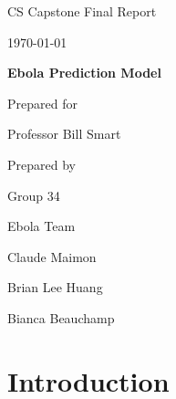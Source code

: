 \documentclass[onecolumn, draftclsnofoot,10pt, compsoc]{IEEEtran}
\def \CapstoneTeamName{		Ebola Team}
\def \CapstoneTeamNumber{		34}
\def \GroupMemberOne{			Claude Maimon}
\def \GroupMemberTwo{			Brian Lee Huang}
\def \GroupMemberThree{			Bianca Beauchamp}
\def \CapstoneProjectName{		Ebola Prediction Model}
\def \CapstoneSponsorCompany{	Professor Bill Smart}
\def \DocType{		Final Report
}
\newcommand{\NameSigPair}[1]{\par
	\makebox[2.75in][r]{#1} \hfil 	\makebox[3.25in]{\makebox[2.25in]{\hrulefill} \hfill		\makebox[.75in]{\hrulefill}}
	\par\vspace{-12pt} \textit{\tiny\noindent
		\makebox[2.75in]{} \hfil		\makebox[3.25in]{\makebox[2.25in][r]{Signature} \hfill	\makebox[.75in][r]{Date}}}}
\renewcommand{\NameSigPair}[1]{#1}
\begin{document}
	\begin{titlepage}
		\begin{singlespace}
			\hfill 
			\par\vspace{.2in}
			\centering
			\scshape{
				\huge CS Capstone \DocType \par
				{\large\today}\par
				\vspace{.5in}
				\textbf{\Huge\CapstoneProjectName}\par
				\vfill
				{\large Prepared for}\par
				\Huge \CapstoneSponsorCompany\par
				\vspace{5pt}
				{\large Prepared by }\par
				Group\CapstoneTeamNumber\par
				\CapstoneTeamName\par 
				\vspace{5pt}
				{\Large
					\NameSigPair{\GroupMemberOne}\par
					\NameSigPair{\GroupMemberTwo}\par
					\NameSigPair{\GroupMemberThree}\par
				}
				\vspace{20pt}
			}
			\begin{abstract}
There is currently no way to take a persons temperature without being within a close proximity to their bodies, putting health care workers at a great risk of infection. The purpose of this project is to reduce this risk by creating a device that quickly takes a persons core body temperature from a distance using a thermal camera. This report is discusses this project, the process of creating it and the outcome.
			\end{abstract}  
		   
		\end{singlespace}
	\end{titlepage}

	\newpage
	\tableofcontents
	\clearpage
	
	\section{Introduction}
	
\end{document}

